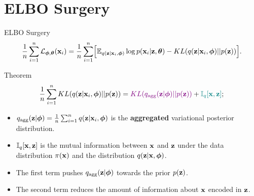 \documentclass{beamer}
\begin{document}
\section{ELBO Surgery}
\begin{frame}{ELBO Surgery}
	\vspace{-0.3cm}
	\[
	    \frac{1}{n} \sum_{i=1}^n \mathcal{L}_{\boldsymbol{\phi}, \boldsymbol{\theta}}(\mathbf{x}_i) = \frac{1}{n} \sum_{i=1}^n \Bigl[ \mathbb{E}_{q(\mathbf{z} | \mathbf{x}_i, \boldsymbol{\phi})} \log p(\mathbf{x}_i | \mathbf{z}, \boldsymbol{\theta}) - KL(q(\mathbf{z} | \mathbf{x}_i, \boldsymbol{\phi}) || p(\mathbf{z})) \Bigr].
	\]
	\vspace{-0.3cm}
	\begin{block}{Theorem}
		\vspace{-0.5cm}
		\[
		    \frac{1}{n} \sum_{i=1}^n KL(q(\mathbf{z} | \mathbf{x}_i, \boldsymbol{\phi}) || p(\mathbf{z})) = {\color{violet} KL(q_{\text{agg}}(\mathbf{z} | \boldsymbol{\phi}) || p(\mathbf{z}))} + {\color{teal}\mathbb{I}_{q} [\mathbf{x}, \mathbf{z}]};
		\]
		\vspace{-0.5cm}
		\begin{itemize}
			\item $q_{\text{agg}}(\mathbf{z} | \boldsymbol{\phi}) = \frac{1}{n} \sum_{i=1}^n q(\mathbf{z} | \mathbf{x}_i, \boldsymbol{\phi})$ is the \textbf{aggregated} variational posterior distribution.
			\item $\mathbb{I}_{q} [\mathbf{x}, \mathbf{z}]$ is the mutual information between $\mathbf{x}$ and $\mathbf{z}$ under the data distribution $\pi(\mathbf{x})$ and the distribution $q(\mathbf{z} | \mathbf{x}, \boldsymbol{\phi})$.
			\item  {\color{violet} The first term} pushes $q_{\text{agg}}(\mathbf{z} | \boldsymbol{\phi})$ towards the prior $p(\mathbf{z})$.
			\item {\color{teal} The second term} reduces the amount of information about $\mathbf{x}$ encoded in $\mathbf{z}$. 
		\end{itemize}
	\end{block}
\end{frame}
\end{document}
